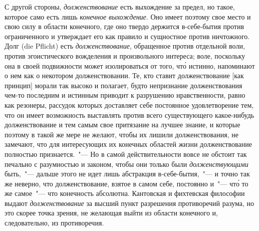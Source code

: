 С другой стороны, \emph{долженствование} есть выхождение
за предел, но такое, которое само есть лишь \emph{конечное выхождение}.
Оно имеет поэтому свое место и свою силу в
области конечного, где оно твердо держится в-себе-бытия
против ограниченного и утверждает его как правило и
сущностное против ничтожного. Долг (die Pflicht) есть
\emph{долженствование}, обращенное против отдельной воли, против
эгоистического вожделения и произвольного интереса;
воле, поскольку она в своей подвижности может изолироваться
от того, чт\'о истинно, напоминают о нем как
о некотором долженствовании. Те, кто ставит долженствование
[как принцип] морали так высоко и полагает, будто
непризнание долженствования чем-то последним и
истинным приводит к разрушению нравственности, равно
как резонеры, рассудок которых доставляет себе постоянное
удовлетворение тем, что он имеет возможность выставлять
против всего существующего какое-нибудь долженствование
и тем самым свое притязание на лучшее
знание, и которые поэтому в такой же мере не желают,
чтобы их лишили долженствования, не замечают, что для
интересующих их конечных областей жизни долженствование
полностью признается.~"--- Но в самой действительности
вовсе не обстоит так печально с разумностью и законом,
чтобы они только были \emph{долженствующими} быть,~"---
дальше этого не идет лишь абстракция в-себе-бытия,~"--- и
точно так же неверно, что долженствование, взятое в самом
себе, постоянно и~"--- чт\'о то же самое~"--- что конечность
абсолютна. Кантовская и фихтевская философии
выдают \emph{долженствование} за высший пункт разрешения
противоречий разума, но это скорее точка зрения, не желающая
выйти из области конечного и, следовательно, из
противоречия.


